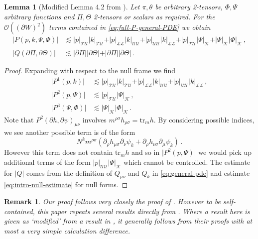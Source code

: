 \documentclass[11pt, a4paper]{amsart}
\numberwithin{equation}{section}
\newtheorem{lemma}[theorem]{Lemma}
\newtheorem{remark}[theorem]{Remark}
\numberwithin{theorem}{section}
\newcommand{\p}{\partial}
\newcommand{\mn}{{\mu \nu}}
\newcommand{\pgood}{\overline{\partial}}
\newcommand{\tr}{\text{tr}}
\newcommand{\UU}{{\mathcal{U} \mathcal{U}}}
\newcommand{\LL}{{\mathcal{L} \mathcal{L}}}
\newcommand{\TU}{{\mathcal{T} \mathcal{U}}}
\newcommand{\K}{\mathcal{K}}
\begin{document}
\begin{lemma}[Modified Lemma 4.2 from \cite{LR:04}] \label{lemma-4.2}
Let $\pi, \theta$ be arbitrary 2-tensors, $\Phi, \Psi$ arbitrary functions and $\Pi, \Theta$ 2-tensors or scalars as required. For the $\mathcal{O}((\p W)^2)$ terms contained in \eqref{eq:full-P-general-PDE} we obtain
\begin{align*} 
\vert P(p, k, \Psi, \Phi)\vert & \lesssim \vert p \vert_\TU \vert k \vert_\TU + \vert p \vert_\LL \vert k \vert_\UU + \vert p \vert_\UU \vert k \vert_\LL + \vert p \vert_\TU \vert \Psi \vert_\K + \vert \Psi \vert_\K \vert \Phi \vert_\K \,, \\
\vert Q(\p \Pi, \p \Theta) \vert & \lesssim \vert \pgood \Pi \vert \vert \p \Theta \vert + \vert \p \Pi \vert \vert \pgood \Theta \vert \,.
\end{align*}
\end{lemma}
\begin{proof}
Expanding with respect to the null frame we find
\begin{align*}
\vert P^1 (p, k)\vert & \lesssim  \vert p \vert_\TU \vert k \vert_\TU + \vert p \vert_\LL \vert k \vert_\UU  + \vert p \vert_\UU \vert k \vert_\LL \,, \\ 
\vert P^2 (p, \Psi) \vert  &\lesssim \vert p \vert_\TU \vert \Psi \vert_\K \,, \\
\vert P^3 (\Psi, \Phi) \vert  &\lesssim \vert \Psi \vert_\K \vert \Phi \vert_\K \,.
\end{align*}
Note that $P^2(\p h, \p \psi)_\mn$ involves $m^{\rho \sigma} h_{\rho \sigma} = \tr_m h$. By considering possible indices, we see another possible term is of the form 
$$ N^k m^{\rho \sigma} \left( \p_\rho h_{\mu \sigma} \p_\nu \psi_k + \p_\rho h_{\nu \sigma} \p_\mu \psi_k \right) \,.$$
However this term does not contain $\tr_m h$ and so in $\vert P^2 (p, \Psi) \vert$ we would pick up additional terms of the form $\vert p \vert_\UU \vert \Psi \vert_\K$ which cannot be controlled. 
The estimate for $\vert Q \vert$ comes from the definition of $Q_\mn$ and $Q_k$ in \eqref{eq:general-pde} and estimate \eqref{eq:intro-null-estimate} for null forms.  
\end{proof}


\begin{remark}
Our proof follows very closely the proof of \cite{LR:04}. However to be self-contained, this paper repeats several results directly from \cite{LR:04}. Where a result here is given as `modified' from a result in \cite{LR:04}, it generally follows from their proofs with at most a very simple calculation difference.
\end{remark} 
\end{document}
